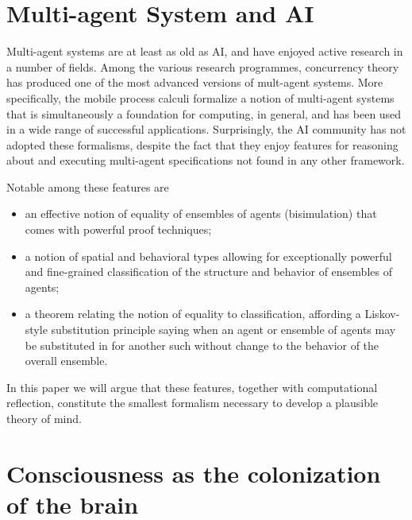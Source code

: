 \documentclass[runningheads]{llncs}
\begin{document}


\section{Multi-agent System and AI}
Multi-agent systems are at least as old as AI, and have enjoyed active research in a number of fields. Among the various research programmes, concurrency theory has produced one of the most advanced versions of mult-agent systems. More specifically, the mobile process calculi formalize a notion of multi-agent systems that is simultaneously a foundation for computing, in general, and has been used in a wide range of successful applications. Surprisingly, the AI community has not adopted these formalisms, despite the fact that they enjoy features for reasoning about and executing multi-agent specifications not found in any other framework.

Notable among these features are
\begin{itemize}
  \item an effective notion of equality of ensembles of agents (bisimulation) that comes with powerful proof techniques;
  \item a notion of spatial and behavioral types allowing for exceptionally powerful and fine-grained classification of the structure and behavior of ensembles of agents;
  \item a theorem relating the notion of equality to classification, affording a Liskov-style substitution principle saying when an agent or ensemble of agents may be substituted in for another such without change to the behavior of the overall ensemble.
\end{itemize}

In this paper we will argue that these features, together with computational reflection, constitute the smallest formalism necessary to develop a plausible theory of mind.



\vspace{1\baselineskip}
\section{Consciousness as the colonization of the brain}
\end{document}
